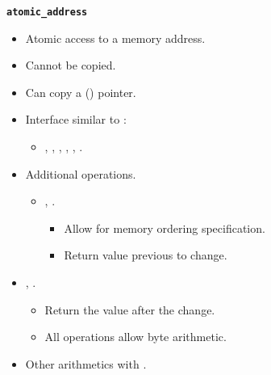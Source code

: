 \begin{frame}[t,fragile]{\texttt{\textbf{atomic\_address}}}
\begin{itemize}
  \item Atomic access to a memory address.
  \item Cannot be copied.
  \item Can copy a () pointer.
  \item Interface similar to :
    \begin{itemize}
      \item {}, , , ,
            , .
    \end{itemize}
  \item Additional operations.
    \begin{itemize}
      \item {}, .
        \begin{itemize}
          \item Allow for memory ordering specification.
          \item Return value previous to change.
        \end{itemize}
    \end{itemize}
      \item \cppid{+=}, \cppid{-=}.
        \begin{itemize}
          \item Return the value after the change.
          \item All operations allow byte arithmetic.
        \end{itemize}
      \item Other arithmetics with .
\end{itemize}
\end{frame}

